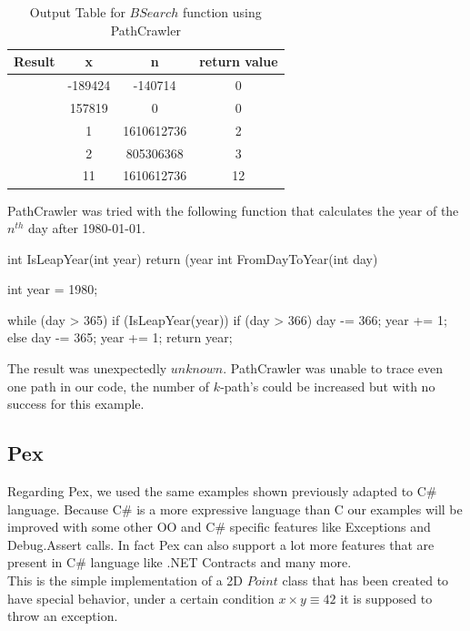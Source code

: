 \documentclass[a4paper,UKenglish]{oasics}
\newcommand{\checkK}{\color{green}\checkmark}
\begin{document}
\begin{table}[!ht]
\renewcommand{\arraystretch}{1.3}
\caption{Output Table for $BSearch$ function using PathCrawler}
\label{tab:bsearch}
\centering
\noindent \begin{tabular}{|c|c|c|c|}\hline
Result & x & n & return value \\\hline
\checkK & -189424 & -140714 & 0 \\\hline
\checkK & 157819 & 0 & 0 \\\hline
\checkK & 1 & 1610612736 & 2 \\\hline
\checkK & 2 & 805306368 & 3 \\\hline
\checkK & 11 & 1610612736 & 12 \\\hline
\end{tabular}
\end{table}

PathCrawler was tried with the following function that calculates the year of the $n^{th}$ day after 1980-01-01.

\begin{code}
int IsLeapYear(int year) {
  return (year %
}
int FromDayToYear(int day) {
  int year = 1980;

  while (day > 365) {
    if (IsLeapYear(year)) {
      if (day > 366) {
        day -= 366;
        year += 1;
      }
    } else {
      day -= 365;
      year += 1;
    }
  }
  return year;
}
\end{code}

The result was unexpectedly $unknown$. PathCrawler was unable to trace even one path in our code, the number of $k$-path's could
be increased but with no success for this example.

\subsection{Pex}
Regarding Pex, we used the same examples shown previously adapted to C\# language.
Because C\# is a more expressive language than C our examples will be improved with some other OO and C\# specific features like Exceptions and Debug.Assert calls.
In fact Pex can also support a lot more features that are present in C\# language like .NET Contracts and many more.\\
This is the simple implementation of a 2D $Point$ class that has been created to have special behavior, under a certain condition
$x \times y \equiv 42$ it is supposed to throw an exception.
\end{document}
